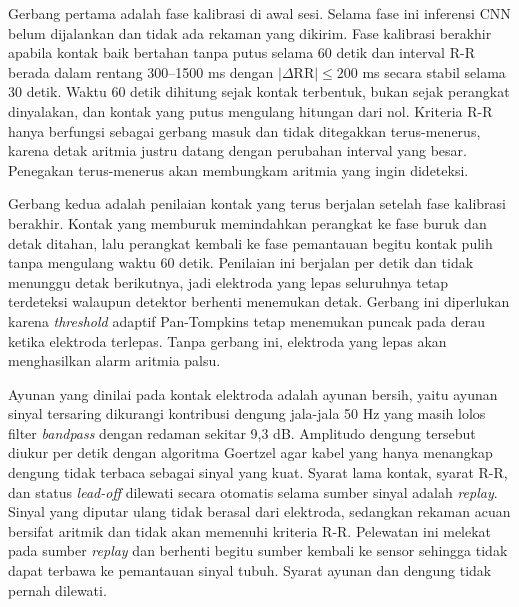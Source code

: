 Gerbang pertama adalah fase kalibrasi di awal sesi. Selama fase ini inferensi
CNN belum dijalankan dan tidak ada rekaman yang dikirim. Fase kalibrasi berakhir
apabila kontak baik bertahan tanpa putus selama 60 detik dan interval R-R berada
dalam rentang 300--1500 ms dengan $|\Delta \mathrm{RR}| \leq 200$ ms secara
stabil selama 30 detik. Waktu 60 detik dihitung sejak kontak terbentuk, bukan
sejak perangkat dinyalakan, dan kontak yang putus mengulang hitungan dari nol.
Kriteria R-R hanya berfungsi sebagai gerbang masuk dan tidak ditegakkan
terus-menerus, karena detak aritmia justru datang dengan perubahan interval yang
besar. Penegakan terus-menerus akan membungkam aritmia yang ingin dideteksi.

Gerbang kedua adalah penilaian kontak yang terus berjalan setelah fase
kalibrasi berakhir. Kontak yang memburuk memindahkan perangkat ke fase buruk dan
detak ditahan, lalu perangkat kembali ke fase pemantauan begitu kontak pulih
tanpa mengulang waktu 60 detik. Penilaian ini berjalan per detik dan tidak
menunggu detak berikutnya, jadi elektroda yang lepas seluruhnya tetap terdeteksi
walaupun detektor berhenti menemukan detak. Gerbang ini diperlukan karena
\textit{threshold} adaptif Pan-Tompkins tetap menemukan puncak pada derau ketika
elektroda terlepas. Tanpa gerbang ini, elektroda yang lepas akan menghasilkan
alarm aritmia palsu.

Ayunan yang dinilai pada kontak elektroda adalah ayunan bersih, yaitu ayunan sinyal tersaring dikurangi kontribusi dengung jala-jala 50 Hz yang masih lolos filter \textit{bandpass} dengan redaman sekitar 9,3 dB. Amplitudo dengung tersebut diukur per detik dengan algoritma Goertzel agar kabel yang hanya menangkap dengung tidak terbaca sebagai sinyal yang kuat. Syarat lama kontak, syarat R-R, dan status \textit{lead-off} dilewati secara otomatis selama sumber sinyal adalah \textit{replay}. Sinyal yang diputar ulang tidak berasal dari elektroda, sedangkan rekaman acuan bersifat aritmik dan tidak akan memenuhi kriteria R-R. Pelewatan ini melekat pada sumber \textit{replay} dan berhenti begitu sumber kembali ke sensor sehingga tidak dapat terbawa ke pemantauan sinyal tubuh. Syarat ayunan dan dengung tidak pernah dilewati.

